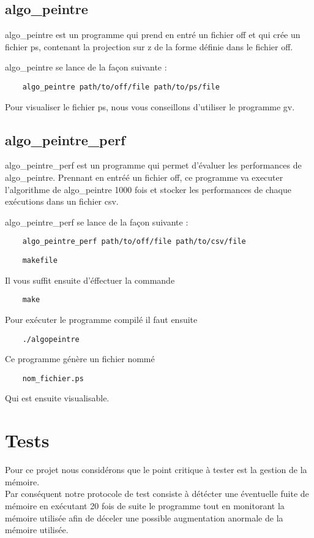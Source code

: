\documentclass[a4paper]{article}
\begin{document}
\subsection{algo\_peintre}
algo\_peintre est un programme qui prend en entré un fichier off et qui crée un fichier ps, contenant la projection sur z de la forme définie dans le fichier off.

algo\_peintre se lance de la façon suivante :
\begin{lstlisting}
	algo_peintre path/to/off/file path/to/ps/file
\end{lstlisting}

Pour visualiser le fichier ps, nous vous conseillons d'utiliser le programme gv.

\subsection{algo\_peintre\_perf}
algo\_peintre\_perf est un programme qui permet d'évaluer les performances de algo\_peintre. Prennant en entréé un fichier off, ce programme va executer l'algorithme de algo\_peintre 1000 fois et stocker les performances de chaque exécutions dans un fichier csv.

algo\_peintre\_perf se lance de la façon suivante :
\begin{lstlisting}
	algo_peintre_perf path/to/off/file path/to/csv/file
\end{lstlisting}



\begin{lstlisting}
	makefile
\end{lstlisting}
Il vous suffit ensuite d'éffectuer la commande
\begin{lstlisting}
	make
\end{lstlisting}
Pour exécuter le programme compilé il faut ensuite
\begin{lstlisting}
	./algopeintre
\end{lstlisting}
Ce programme génère un fichier nommé
\begin{lstlisting}
	nom_fichier.ps
\end{lstlisting}
Qui est ensuite visualisable.

\section{Tests}
Pour ce projet nous considérons que le point critique à tester est la gestion de la mémoire. \\
Par conséquent notre protocole de test consiste à détécter une éventuelle fuite de mémoire en exécutant 20 fois de suite le programme tout en monitorant la mémoire utilisée afin de déceler une possible augmentation anormale de la mémoire utilisée.
\end{document}

